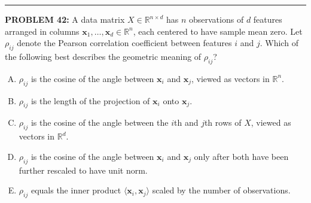 \documentclass[12pt]{amsart}
\newcommand{\divider}{
  \vspace{-1em} %
  \noindent
  \raisebox{-0.15ex}{\textbullet}%
  \hspace{0.5em}%
  \rule[0.5ex]{0.95\textwidth}{1.0pt}%
  \hspace{0.5em}%
  \raisebox{-0.15ex}{\textbullet}%
  \vspace{0em} %
}
\begin{document}

\divider

{\bf PROBLEM 42:}
%
A data matrix $X \in \mathbb{R}^{n \times d}$ has $n$ observations of $d$ features
arranged in columns $\mathbf{x}_1, \ldots, \mathbf{x}_d \in \mathbb{R}^n$, each
centered to have sample mean zero. Let $\rho_{ij}$ denote the Pearson correlation
coefficient between features $i$ and $j$. Which of the following best describes
the geometric meaning of $\rho_{ij}$?

\begin{enumerate}[(A)]
\item $\rho_{ij}$ is the cosine of the angle between $\mathbf{x}_i$ and $\mathbf{x}_j$, viewed as vectors in $\mathbb{R}^n$.
\item $\rho_{ij}$ is the length of the projection of $\mathbf{x}_i$ onto $\mathbf{x}_j$.
\item $\rho_{ij}$ is the cosine of the angle between the $i$th and $j$th rows of $X$, viewed as vectors in $\mathbb{R}^d$.
\item $\rho_{ij}$ is the cosine of the angle between $\mathbf{x}_i$ and $\mathbf{x}_j$ only after both have been further rescaled to have unit norm.
\item $\rho_{ij}$ equals the inner product $\langle \mathbf{x}_i, \mathbf{x}_j \rangle$ scaled by the number of observations.
\end{enumerate}
\end{document}
